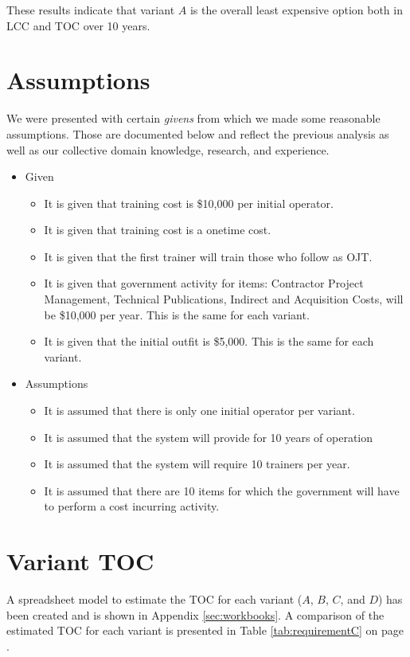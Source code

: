 \documentclass[letterpaper,10pt]{article}
\begin{document}
These results indicate that variant $A$ is the overall least expensive option both in LCC and TOC over 10 years.

\section{Assumptions}
We were presented with certain \emph{givens} from which we made some reasonable assumptions.  Those are documented below and reflect the previous analysis as well as our collective domain knowledge, research, and experience.

\begin{itemize}
\item Given 
	\begin{itemize}
		\item It is given that training cost is \$10,000 per initial operator.
		\item It is given that training cost is a onetime cost.
		\item It is given that the first trainer will train those who follow as OJT.
		\item It is given that government activity for items: Contractor Project Management, Technical Publications, Indirect and Acquisition Costs, will be \$10,000 per year. This is the same for each variant.
		\item It is given that the initial outfit is \$5,000. This is the same for each variant.
	\end{itemize}

\item Assumptions
	\begin{itemize}
		\item It is assumed that there is only one initial operator per variant.
		\item It is assumed that the system will provide for 10 years of operation
		\item It is assumed that the system will require 10 trainers per year.
		\item It is assumed that there are 10 items for which the government will have to perform a cost incurring activity.
	\end{itemize}
\end{itemize}

\section{Variant TOC}
A spreadsheet model to estimate the TOC for each variant ($A$, $B$, $C$, and $D$) has been created and is shown in Appendix \ref{sec:workbooks}. A comparison of the estimated TOC for each variant is presented in Table \ref{tab:requirementC} on page \pageref{tab:requirementC}. 
\end{document}
